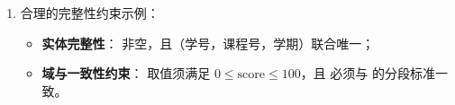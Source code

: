 \begin{exercise}[title={数据模型三要素与属性尺度判别},level=basic,points=10,tags={数据模型,属性尺度,完整性约束}]
\begin{solution}
\begin{enumerate}
\begin{itemize}
    \item {}（公历年份）的差值表示间隔年数，但公元 $0$ 年并非绝对零点，比值无意义，属\textbf{区间型（Interval）}；
    \item {} 以 $0$ 分为绝对零点，差值与比例均有意义，属\textbf{比例型（Ratio）}。
  \end{itemize}
  \item 合理的完整性约束示例：
  \begin{itemize}
    \item \textbf{实体完整性}： 非空，且（学号，课程号，学期）联合唯一；
    \item \textbf{域与一致性约束}： 取值须满足 $0\le \text{score}\le 100$，且  必须与  的分段标准一致。
  \end{itemize}
\end{enumerate}
\end{solution}
\end{exercise}

